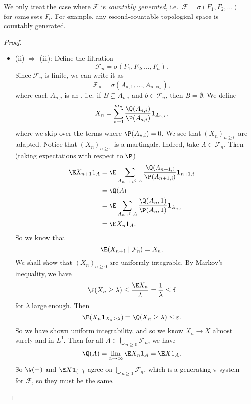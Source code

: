 \documentclass[a4paper]{article}
\begin{document}
We only treat the case where $\mathcal{F}$ is \emph{countably generated}, i.e.\ $\mathcal{F} = \sigma(F_1, F_2, \ldots)$ for some sets $F_i$. For example, any second-countable topological space is countably generated.
\begin{proof}\leavevmode
  \begin{itemize}
    \item (ii) $\Rightarrow$ (iii): Define the filtration
      \[
        \mathcal{F}_n = \sigma(F_1, F_2, \ldots, F_n).
      \]
      Since $\mathcal{F}_n$ is finite, we can write it as
      \[
        \mathcal{F}_n = \sigma(A_{n, 1}, \ldots, A_{n, m_n}), 
      \]
      where each $A_{n, i}$ is an , i.e.\ if $B \subsetneq A_{n, i}$ and $b \in \mathcal{F}_n$, then $B = \emptyset$. We define
      \[
        X_n = \sum_{n = 1}^{m_n} \frac{\Q(A_{n, i})}{\P(A_{n, i})} \mathbf{1}_{A_{n, i}},
      \]
      where we skip over the terms where $\P(A_{n, i}) = 0$. We see that $(X_n)_{n \geq 0}$ are adapted. Notice that $(X_n)_{n \geq 0}$ is a martingale. Indeed, take $A \in \mathcal{F}_n$. Then (taking expectations with respect to $\P$)
      \begin{align*}
        \E X_{n + 1} \mathbf{1}_A &= \E \sum_{A_{n + 1, i} \subseteq A} \frac{\Q(A_{n + 1, i}}{\P(A_{n + 1, i})} \mathbf{1}_{n + 1, i} \\
        &= \Q(A)\\
        &= \E \sum_{A_{n, 1} \subseteq A} \frac{\Q(A_n, 1)}{\P(A_n, 1)} \mathbf{1}_{A_{n, i}}\\
        &= \E X_n \mathbf{1}_A.
      \end{align*}
      So we know that
      \[
        \E(X_{n + 1} \mid \mathcal{F}_n) = X_n.
      \]
      We shall show that $(X_n)_{n \geq 0}$ are uniformly integrable. By Markov's inequality, we have
      \[
        \P(X_n \geq \lambda) \leq \frac{\E X_n}{\lambda} = \frac{1}{\lambda}\leq \delta
      \]
      for $\lambda$ large enough. Then
      \[
        \E(X_n \mathbf{1}_{X_n \geq \lambda}) = \Q(X_n \geq \lambda) \leq \varepsilon.
      \]
      So we have shown uniform integrability, and so we know $X_n \to X$ almost surely and in $L^1$. Then for all $A \in \bigcup_{n \geq 0} \mathcal{F}_n$, we have
      \[
        \Q(A) = \lim_{n \to \infty} \E X_n \mathbf{1}_A = \E X \mathbf{1}_A.
      \]
      So $\Q(-)$ and $\E X \mathbf{1}_{(-)}$ agree on $\bigcup_{n \geq 0} \mathcal{F}_n$, which is a generating $\pi$-system for $\mathcal{F}$, so they must be the same.

\end{itemize}
\end{proof}
\end{document}
